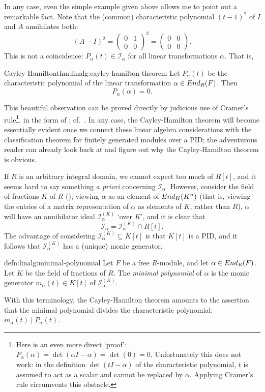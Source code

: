 In any case, even the simple example given above allows me to point
out a remarkable fact. Note that the (common) characteristic
polynomial $(t-1)^2$ of $I$ and $A$ annihilates both:
\[
  (A - I)^2 = \begin{pmatrix} 0 & 1 \\ 0 & 0 \end{pmatrix}^2 =
  \begin{pmatrix} 0 & 0 \\ 0 & 0 \end{pmatrix}.
\]
This is not a coincidence: $P_\alpha(t) \in \mathscr{I}_\alpha$ for
all linear transformations $\alpha$. That is,
\begin{thm}{Cayley-Hamilton}{thm:linalg:cayley-hamilton-theorem}
  Let $P_\alpha(t)$ be the characteristic polynomial of the linear
  transformation $\alpha \in End_R(F)$. Then
  \[
    P_\alpha(\alpha) = 0.
  \]
\end{thm}
This beautiful observation can be proved directly by judicious use of
Cramer's rule\footnote{Here is an even more direct `proof':
  $P_\alpha(\alpha) = \det(\alpha I - \alpha) = \det(0) = 0$.
  Unfortunately this does not work: in the definition
  $\det(tI - \alpha)$ of the characteristic polynomial, $t$ is assumed
  to act as a scalar and cannot be replaced by $\alpha$. Applying
  Cramer's rule circumvents this obstacle.}, in the form of
; cf.\ . In
any case, the Cayley-Hamilton theorem will become essentially evident
once we connect these linear algebra considerations with the
classification theorem for finitely generated modules over a PID; the
adventurous reader can already look back at  and
figure out why the Cayley-Hamilton theorem is obvious.

If $R$ is an arbitrary integral domain, we cannot expect too much of
$R[t]$, and it seems hard to say something \emph{a priori} concerning
$\mathscr{I}_\alpha$. However, consider the field of fractions $K$ of
$R$
();
viewing $\alpha$ as an element of $End_K(K^n)$ (that is, viewing the
entries of a matrix representation of $\alpha$ as elements of $K$,
rather than $R$), $\alpha$ will have an annihilator ideal
$\mathscr{I}_\alpha^{(K)}$ `over $K$', and it is clear that
\[
  \mathscr{I}_\alpha = \mathscr{I}_\alpha^{(K)} \cap R[t].
\]
The advantage of considering $\mathscr{I}_\alpha^{(K)} \subseteq K[t]$
is that $K[t]$ is a PID, and it follows that
$\mathscr{I}_\alpha^{(K)}$ has a (unique) monic generator.
\begin{defn}{}{defn:linalg:minimal-polynomial}
  Let $F$ be a free $R$-module, and let $\alpha \in End_R(F)$. Let
  $K$ be the field of fractions of $R$. The \emph{minimal polynomial}
  of $\alpha$ is the monic generator $m_\alpha(t) \in K[t]$ of
  $\mathscr{I}_\alpha^{(K)}$.
\end{defn}
With this terminology, the Cayley-Hamilton theorem amounts to the
assertion that the minimal polynomial divides the characteristic
polynomial: $m_\alpha(t) \mid P_\alpha(t)$.

